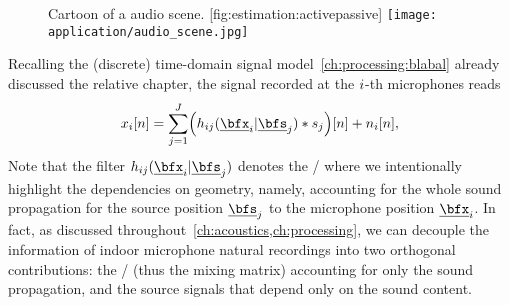 \begin{figure}[]
    \begin{sidecaption}{%
        Cartoon of a audio scene.
    }[fig:estimation:activepassive]
    \centering
    \texttt{[image: application/audio\_scene.jpg]}
    \end{sidecaption}
\end{figure}

Recalling the (discrete) time-domain signal model~\cref{ch:processing:blabal} already discussed the relative chapter, the signal recorded at the $i$-th microphones reads
\begin{equation}
    \label{eq:application:stft}
    \mic_\idxMic[n] = \sum_{\idxSrc = 1}^{\numSrcs}
        \kparen{\flt_{\idxMicSrc}( \positionMicrophone_{\idxMic}  | \positionSource_{\idxSrc}) \convDis \src_{\idxSrc}} [n] + \nse_\idxMic[n]
    ,
\end{equation}
Note that the filter $\flt_{\idxMicSrc}(\positionMicrophone_{\idxMic} | \positionSource_{\idxSrc})$ denotes the \RIR/ where we intentionally highlight the dependencies on geometry,
namely, accounting for the whole sound propagation for the source position $\positionSource_{\idxSrc}$ to the microphone position $\positionMicrophone_{\idxMic}$.
In fact, as discussed throughout~\cref{ch:acoustics,ch:processing}, we can decouple the information of indoor microphone natural recordings into two orthogonal contributions:
the \RIRs/ (thus the mixing matrix) accounting for only the sound propagation, and the source signals that depend only on the sound content.

\newcommand{\setMicSignals}{\ensuremath{\set{\mic_{\idxMic}}_\idxMic}}
\newcommand{\setSrcSignals}{\ensuremath{\set{\src_{\idxSrc}}_\idxSrc}}
\newcommand{\setSrcPositions}{\ensuremath{\set{\positionSource_{\idxSrc}}_\idxSrc}}
\newcommand{\setFltSignals}{\ensuremath{\set{\flt_{\idxMicSrc}(\positionMicrophone_{\idxMic} | \positionSource_{\idxSrc})}_{\idxMicSrc}}}



